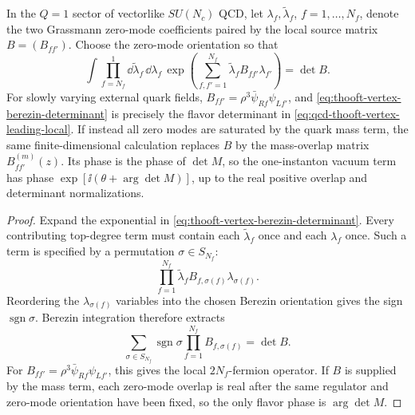 \begin{proposition}
\label{prop:qcd-thooft-determinant-zero-mode-amplitude}
In the \(Q=1\) sector of vectorlike \(SU(N_c)\) QCD, let
\(\lambda_f,\widetilde\lambda_f\), \(f=1,\ldots,N_f\), denote the two
Grassmann zero-mode coefficients paired by the local source matrix
\(B=(B_{ff'})\).  Choose the zero-mode orientation so that
\begin{equation}
  \int
  \prod_{f=N_f}^{1}\dd\widetilde\lambda_f\,\dd\lambda_f\,
  \exp\!\left(
    \sum_{f,f'=1}^{N_f}
    \widetilde\lambda_f B_{ff'}\lambda_{f'}
  \right)
  =
  \det B .
  \label{eq:thooft-vertex-berezin-determinant}
\end{equation}
For slowly varying external quark fields,
\(B_{ff'}=\rho^3\bar\psi_{Rf}\psi_{Lf'}\), and
\eqref{eq:thooft-vertex-berezin-determinant} is precisely the flavor
determinant in \eqref{eq:qcd-thooft-vertex-leading-local}.  If instead all
zero modes are saturated by the quark mass term, the same finite-dimensional
calculation replaces \(B\) by the mass-overlap matrix
\(B^{(m)}_{ff'}(z)\).  Its phase is the phase of \(\det M\), so the
one-instanton vacuum term has phase
\(\exp[\ii(\theta+\arg\det M)]\), up to the real positive overlap and
determinant normalizations.
\end{proposition}

\begin{proof}
Expand the exponential in
\eqref{eq:thooft-vertex-berezin-determinant}.  Every contributing top-degree
term must contain each \(\widetilde\lambda_f\) once and each \(\lambda_f\)
once.  Such a term is specified by a permutation \(\sigma\in S_{N_f}\):
\[
  \prod_{f=1}^{N_f}
  \widetilde\lambda_f B_{f,\sigma(f)}\lambda_{\sigma(f)} .
\]
Reordering the \(\lambda_{\sigma(f)}\) variables into the chosen Berezin
orientation gives the sign \(\operatorname{sgn}\sigma\).  Berezin integration
therefore extracts
\[
  \sum_{\sigma\in S_{N_f}}
  \operatorname{sgn}\sigma
  \prod_{f=1}^{N_f}B_{f,\sigma(f)}
  =
  \det B .
\]
For \(B_{ff'}=\rho^3\bar\psi_{Rf}\psi_{Lf'}\), this gives the local
\(2N_f\)-fermion operator.  If \(B\) is supplied by the mass term, each
zero-mode overlap is real after the same regulator and zero-mode orientation
have been fixed, so the only flavor phase is \(\arg\det M\).
\end{proof}

